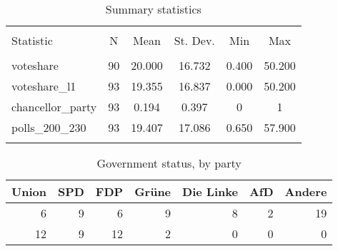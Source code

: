 
\begin{table}[!htbp] \centering 
  \caption{Summary statistics} 
  \label{} 
\begin{tabular}{@{\extracolsep{5pt}}lccccc} 
\\[-1.8ex]\hline 
\hline \\[-1.8ex] 
Statistic & \multicolumn{1}{c}{N} & \multicolumn{1}{c}{Mean} & \multicolumn{1}{c}{St. Dev.} & \multicolumn{1}{c}{Min} & \multicolumn{1}{c}{Max} \\ 
\hline \\[-1.8ex] 
voteshare & 90 & 20.000 & 16.732 & 0.400 & 50.200 \\ 
voteshare\_l1 & 93 & 19.355 & 16.837 & 0.000 & 50.200 \\ 
chancellor\_party & 93 & 0.194 & 0.397 & 0 & 1 \\ 
polls\_200\_230 & 93 & 19.407 & 17.086 & 0.650 & 57.900 \\ 
\hline \\[-1.8ex] 
\end{tabular} 
\end{table} 

\begin{table*}[t!]
\centering
\caption{Government status, by party} 
\begingroup\small
\begin{tabular}{rrrrrrr}
  \toprule
Union & SPD & FDP & Grüne & Die Linke & AfD & Andere \\ 
  \midrule
6 & 9 & 6 & 9 & 8 & 2 & 19 \\ 
  12 & 9 & 12 & 2 & 0 & 0 & 0 \\ 
   \bottomrule
\end{tabular}
\endgroup
\end{table*}
